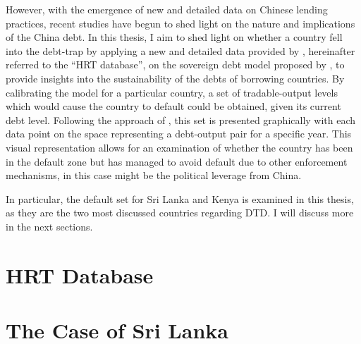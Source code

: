 However, with the emergence of new and detailed data on Chinese lending practices, recent studies have begun to shed light on the nature and implications of the China debt.
In this thesis, I aim to shed light on whether a country fell into the debt-trap by applying a new and detailed data provided by \citet*{Horn-Reinhart-Trebesch-21}, hereinafter referred to the ``HRT database'', on the sovereign debt model proposed by \citet*{Na-18}, to provide insights into the sustainability of the debts of borrowing countries.
By calibrating the model for a particular country, a set of tradable-output levels which would cause the country to default could be obtained, given its current debt level. Following the approach of \citet{Hinrichsen_2020-chapter4}, this set is presented graphically with each data point on the space representing a debt-output pair for a specific year. This visual representation allows for an examination of whether the country has been in the default zone but has managed to avoid default due to other enforcement mechanisms, in this case might be the political leverage from China.

In particular, the default set for Sri Lanka and Kenya is examined in this thesis, as they are the two most discussed countries regarding DTD. I will discuss more in the next sections.

\section{HRT Database}


\section{The Case of Sri Lanka}
